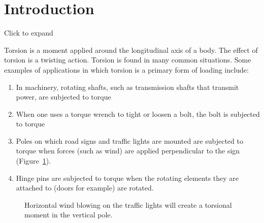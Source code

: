 \documentclass[
  letterpaper,
  DIV=11,
  numbers=noendperiod]{scrreprt}
\providecommand{\tightlist}{%
  \setlength{\itemsep}{0pt}\setlength{\parskip}{0pt}}\usepackage{longtable,booktabs,array}
\theoremstyle{definition}
\theoremstyle{remark}
\begin{document}
\section*{Introduction}\label{introduction-5}


Click to expand

Torsion is a moment applied around the longitudinal axis of a body. The
effect of torsion is a twisting action. Torsion is found in many common
situations. Some examples of applications in which torsion is a primary
form of loading include:

\begin{enumerate}
\def\labelenumi{\arabic{enumi}.}
\tightlist
\item
  In machinery, rotating shafts, such as transmission shafts that
  transmit power, are subjected to torque
\item
  When one uses a torque wrench to tight or loosen a bolt, the bolt is
  subjected to torque
\item
  Poles on which road signs and traffic lights are mounted are subjected
  to torque when forces (such as wind) are applied perpendicular to the
  sign (Figure~\ref{fig-6.1}).
\item
  Hinge pins are subjected to torque when the rotating elements they are
  attached to (doors for example) are rotated.
\end{enumerate}

\begin{figure}


\caption{\label{fig-6.1}Horizontal wind blowing on the traffic lights
will create a torsional moment in the vertical pole.}

\end{figure}%
\end{document}
